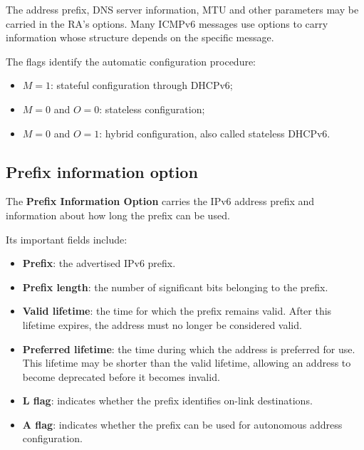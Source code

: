 The address prefix, DNS server information, MTU and other parameters
may be carried in the RA's options. Many ICMPv6 messages use options
to carry information whose structure depends on the specific message.

The flags identify the automatic configuration procedure:

\begin{itemize}
	\item $M=1$: stateful configuration through DHCPv6;
	\item $M=0$ and $O=0$: stateless configuration;
	\item $M=0$ and $O=1$: hybrid configuration, also called stateless
	DHCPv6.
\end{itemize}

\begin{center}
\end{center}

\subsection{Prefix information option}

The \textbf{Prefix Information Option} carries the IPv6 address
prefix and information about how long the prefix can be used.

\begin{center}
\end{center}


Its important fields include:

\begin{itemize}
	\item \textbf{Prefix}: the advertised IPv6 prefix.
	\item \textbf{Prefix length}: the number of significant bits
	belonging to the prefix.
	\item \textbf{Valid lifetime}: the time for which the prefix
	remains valid. After this lifetime expires, the address must no
	longer be considered valid.
	\item \textbf{Preferred lifetime}: the time during which the address
	is preferred for use. This lifetime may be shorter than the valid
	lifetime, allowing an address to become deprecated before it
	becomes invalid.
	\item \textbf{L flag}: indicates whether the prefix identifies
	on-link destinations.
	\item \textbf{A flag}: indicates whether the prefix can be used for
	autonomous address configuration.
\end{itemize}

